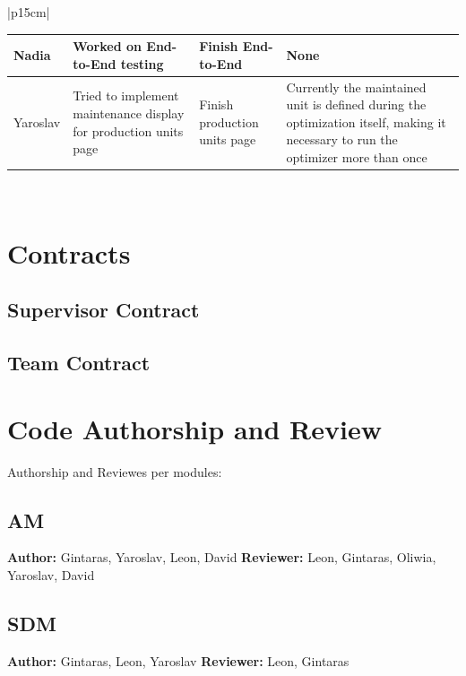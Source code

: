 \begin{table}[H]
    \centering
    \begin{tabular}{|p{15cm}|} 
        \hline
        \begin{table}[H]
            \begin{tabular}{|p{1.75cm}|p{4cm}|p{4cm}|p{4cm}|}
                \hline
                \cellcolor[HTML]{d4d4d4} Nadia & Worked on End-to-End testing & Finish End-to-End & None \\
                \hline
                \cellcolor[HTML]{d4d4d4} Yaroslav & Tried to implement maintenance display for production units page & Finish production units page & Currently the maintained unit is defined during the optimization itself, making it necessary to run the optimizer more than once \\
                \hline 
            \end{tabular}
        \end{table}
        \\
        \hline
    \end{tabular}
\end{table}

\chapter{Contracts}

\section*{Supervisor Contract}


\section*{Team Contract}


\chapter{Code Authorship and Review}

Authorship and Reviewes per modules:
\section*{AM}
\textbf{Author:} Gintaras, Yaroslav, Leon, David
\textbf{Reviewer:} Leon, Gintaras, Oliwia, Yaroslav, David
\section*{SDM}
\textbf{Author:} Gintaras, Leon, Yaroslav
\textbf{Reviewer:} Leon, Gintaras

